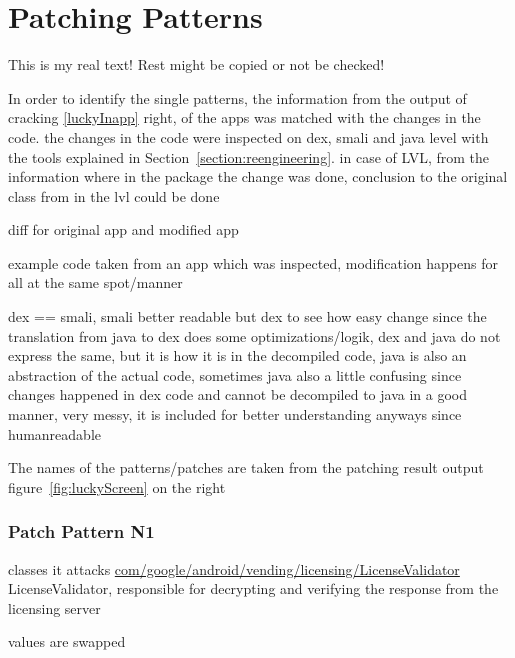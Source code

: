 \section{Patching Patterns} \label{section:luckypatcher-patterns}
This is my real text! Rest might be copied or not be checked!

In order to identify the single patterns, the information from the output of cracking \ref{luckyInapp} right, of the apps was matched with the changes in the code. the changes in the code were inspected on dex, smali and java level with the tools explained in Section~\ref{section:reengineering}. in case of LVL, from the information where in the package the change was done, conclusion to the original class from in the lvl could be done

diff for original app and modified app

example code taken from an app which was inspected, modification happens for all at the same spot/manner

dex == smali, smali better readable but dex to see how easy change
since the translation from java to dex does some optimizations/logik, dex and java do not express the same, but it is how it is in the decompiled code, java is also an abstraction of the actual code, sometimes java also a little confusing since changes happened in dex code and cannot be decompiled to java in a good manner, very messy, it is included for better understanding anyways since humanreadable

The names of the patterns/patches are taken from the patching result output figure~\ref{fig:luckyScreen} on the right
\subsubsection{Patch Pattern N1}
classes it attacks %
\url{com/google/android/vending/licensing/LicenseValidator}
LicenseValidator, responsible for decrypting and verifying the response from the licensing server\cite{developersLicensingReference}



values are swapped



